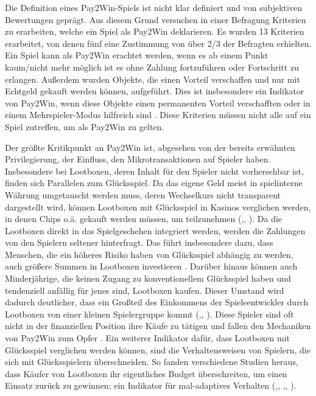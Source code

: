 Die Definition eines Pay2Win-Spiels ist nicht klar definiert und von subjektiven Bewertungen geprägt. Aus diesem Grund versuchen \cite{Tregel2020} in einer Befragung Kriterien zu erarbeiten, welche ein Spiel als Pay2Win deklarieren. Es wurden 13 Kriterien erarbeitet, von denen fünf eine Zustimmung von über 2/3 der Befragten erhielten. Ein Spiel kann als Pay2Win erachtet werden, wenn es ab einem Punkt kaum/nicht mehr möglich ist es ohne Zahlung fortzuführen oder Fortschritt zu erlangen. Außerdem wurden Objekte, die einen Vorteil verschaffen und nur mit Echtgeld gekauft werden können, aufgeführt. Dies ist insbesondere ein Indikator von Pay2Win, wenn diese Objekte einen permanenten Vorteil verschafften oder in einem Mehrspieler-Modus hilfreich sind \citep[S. 179]{Tregel2020}. Diese Kriterien müssen nicht alle auf ein Spiel zutreffen, um als Pay2Win zu gelten.

Der größte Kritikpunkt an Pay2Win ist, abgesehen von der bereits erwähnten Privilegierung, der Einfluss, den Mikrotransaktionen auf Spieler haben. Insbesondere bei Lootboxen, deren Inhalt für den Spieler nicht vorhersehbar ist, finden sich Parallelen zum Glücksspiel. Da das eigene Geld meist in spielinterne Währung umgetauscht werden muss, deren Wechselkurs nicht transparent dargestellt wird, können Lootboxen mit Glücksspiel in Kasinos verglichen werden, in denen Chips o.ä. gekauft werden müssen, um teilzunehmen (\cite[S. 7 ff.]{Drummond2018},, \cite[S. 185 ff.]{Nielsen2019}). Da die Lootboxen direkt in das Spielgeschehen integriert werden, werden die Zahlungen von den Spielern seltener hinterfragt. Das führt insbesondere dazu, dass Menschen, die ein höheres Risiko haben von Glücksspiel abhängig zu werden, auch größere Summen in Lootboxen investieren \citep[S. 5 f.]{Zendle2018}. Darüber hinaus können auch Minderjährige, die keinen Zugang zu konventionellem Glücksspiel haben und tendenziell anfällig für jenes sind, Lootboxen kaufen. Dieser Umstand wird dadurch deutlicher, dass ein Großteil des Einkommens der Spieleentwickler durch Lootboxen von einer kleinen Spielergruppe kommt (\cite[S. 8 f.]{Zendle2020},, \cite{Takahashi2014}). Diese Spieler sind oft nicht in der finanziellen Position ihre Käufe zu tätigen und fallen den Mechaniken von Pay2Win zum Opfer \citep{Close2021}. Ein weiterer Indikator dafür, dass Lootboxen mit Glücksspiel verglichen werden können, sind die Verhaltensweisen von Spielern, die sich mit Glücksspielern überschneiden. So fanden verschiedene Studien heraus, dass Käufer von Lootboxen ihr eigentliches Budget überschreiten, um einen Einsatz zurück zu gewinnen; ein Indikator für mal-adaptives Verhalten (\cite[S. 9 ff.]{Nielsen2019},, \cite[S. 1968 f.]{King2018a},, \cite[S. 4 f.]{Xiao2021}).

